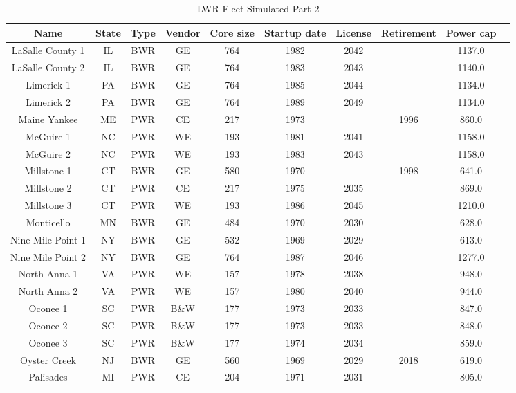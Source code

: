 \begin{table}
    \centering
    \caption{LWR Fleet Simulated Part 2}
    \label{tab:lwr_fleet2}
    \begin{tabular}{c c c c c c c c c c}
    \hline
    \textbf{Name} & \textbf{State} & \textbf{Type} & \textbf{Vendor} & \textbf{Core size} & \textbf{Startup date} & \textbf{License} & \textbf{Retirement} & \textbf{Power cap} \\
    \hline
    LaSalle County 1 & IL & BWR & GE & 764 & 1982 & 2042 &  & 1137.0 \\
    LaSalle County 2 & IL & BWR & GE & 764 & 1983 & 2043 &  & 1140.0 \\
    Limerick 1 & PA & BWR & GE & 764 & 1985 & 2044 &  & 1134.0 \\
    Limerick 2 & PA & BWR & GE & 764 & 1989 & 2049 &  & 1134.0 \\
    Maine Yankee & ME & PWR & CE & 217 & 1973 &  & 1996 & 860.0 \\
    McGuire 1 & NC & PWR & WE & 193 & 1981 & 2041 &  & 1158.0 \\
    McGuire 2 & NC & PWR & WE & 193 & 1983 & 2043 &  & 1158.0 \\
    Millstone 1 & CT & BWR & GE & 580 & 1970 &  & 1998 & 641.0 \\
    Millstone 2 & CT & PWR & CE & 217 & 1975 & 2035 &  & 869.0 \\
    Millstone 3 & CT & PWR & WE & 193 & 1986 & 2045 &  & 1210.0 \\
    Monticello & MN & BWR & GE & 484 & 1970 & 2030 &  & 628.0 \\
    Nine Mile Point 1 & NY & BWR & GE & 532 & 1969 & 2029 &  & 613.0 \\
    Nine Mile Point 2 & NY & BWR & GE & 764 & 1987 & 2046 &  & 1277.0 \\
    North Anna 1 & VA & PWR & WE & 157 & 1978 & 2038 &  & 948.0 \\
    North Anna 2 & VA & PWR & WE & 157 & 1980 & 2040 &  & 944.0 \\
    Oconee 1 & SC & PWR & B\&W & 177 & 1973 & 2033 &  & 847.0 \\
    Oconee 2 & SC & PWR & B\&W & 177 & 1973 & 2033 &  & 848.0 \\
    Oconee 3 & SC & PWR & B\&W & 177 & 1974 & 2034 &  & 859.0 \\
    Oyster Creek & NJ & BWR & GE & 560 & 1969 & 2029 & 2018 & 619.0 \\
    Palisades & MI & PWR & CE & 204 & 1971 & 2031 &  & 805.0 \\

\end{tabular}
\end{table}
